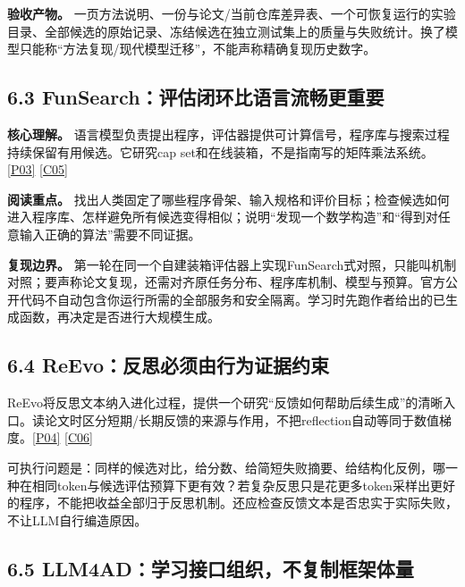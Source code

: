 \textbf{验收产物。}
一页方法说明、一份与论文/当前仓库差异表、一个可恢复运行的实验目录、全部候选的原始记录、冻结候选在独立测试集上的质量与失败统计。换了模型只能称``方法复现/现代模型迁移''，不能声称精确复现历史数字。

\subsection{6.3
FunSearch：评估闭环比语言流畅更重要}\label{funsearchux8bc4ux4f30ux95edux73afux6bd4ux8bedux8a00ux6d41ux7545ux66f4ux91cdux8981}

\textbf{核心理解。}
语言模型负责提出程序，评估器提供可计算信号，程序库与搜索过程持续保留有用候选。它研究cap
set和在线装箱，不是指南写的矩阵乘法系统。\href{https://deepmind.google/blog/funsearch-making-new-discoveries-in-mathematical-sciences-using-large-language-models/}{{[}P03{]}}
\href{https://github.com/google-deepmind/funsearch}{{[}C05{]}}

\textbf{阅读重点。}
找出人类固定了哪些程序骨架、输入规格和评价目标；检查候选如何进入程序库、怎样避免所有候选变得相似；说明``发现一个数学构造''和``得到对任意输入正确的算法''需要不同证据。

\textbf{复现边界。}
第一轮在同一个自建装箱评估器上实现FunSearch式对照，只能叫机制对照；要声称论文复现，还需对齐原任务分布、程序库机制、模型与预算。官方公开代码不自动包含你运行所需的全部服务和安全隔离。学习时先跑作者给出的已生成函数，再决定是否进行大规模生成。

\subsection{6.4
ReEvo：反思必须由行为证据约束}\label{reevoux53cdux601dux5fc5ux987bux7531ux884cux4e3aux8bc1ux636eux7ea6ux675f}

ReEvo将反思文本纳入进化过程，提供一个研究``反馈如何帮助后续生成''的清晰入口。读论文时区分短期/长期反馈的来源与作用，不把reflection自动等同于数值梯度。\href{https://proceedings.neurips.cc/paper_files/paper/2024/hash/4ced59d480e07d290b6f29fc8798f195-Abstract-Conference.html}{{[}P04{]}}
\href{https://github.com/ai4co/reevo}{{[}C06{]}}

可执行问题是：同样的候选对比，给分数、给简短失败摘要、给结构化反例，哪一种在相同token与候选评估预算下更有效？若复杂反思只是花更多token采样出更好的程序，不能把收益全部归于反思机制。还应检查反馈文本是否忠实于实际失败，不让LLM自行编造原因。

\subsection{6.5
LLM4AD：学习接口组织，不复制框架体量}\label{llm4adux5b66ux4e60ux63a5ux53e3ux7ec4ux7ec7ux4e0dux590dux5236ux6846ux67b6ux4f53ux91cf}

